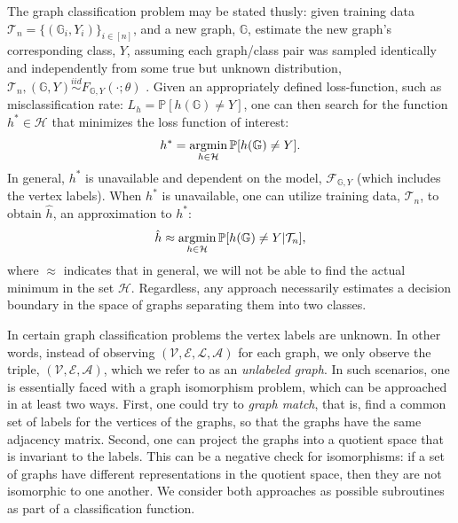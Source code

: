 \documentclass{article} %
\newcommand{\argmin}{\operatornamewithlimits{argmin}}
\newcommand{\PP}{\mathbb{P}}           %
\providecommand{\mc}[1]{\mathcal{#1}}
\providecommand{\mh}[1]{\hat{#1}}
\newcommand{\iid}{\overset{iid}{\sim}}
\newcommand{\GG}{\mathbb{G}}
\begin{document}
The graph classification problem may be stated thusly: given training data $\mc{T}_n=\{(\GG_i,Y_i)\}_{i \in [n]}$, and a new graph, $\GG$, estimate the new graph's corresponding class, $Y$, assuming each graph/class pair was sampled identically and independently from some true but unknown distribution, $\mc{T}_n,(\GG,Y) \iid F_{\GG,Y}(\cdot; \theta)$ .  Given an appropriately defined loss-function, such as misclassification rate: $L_h=\PP[h(\GG) \neq Y]$, one can then search for the function $h^* \in \mc{H}$ that minimizes the loss function of interest:
\begin{align}
	h^* = \argmin_{h \in \mc{H}} \PP[h(\GG) \neq Y].
\end{align}
In general, $h^*$ is unavailable and dependent on the model, $\mc{F}_{\GG,Y}$ (which includes the vertex labels).  When $h^*$ is unavailable, one can utilize training data, $\mc{T}_n$, to obtain $\mh{h}$, an approximation to $h^*$:
\begin{align}
	\mh{h} \approx \argmin_{h \in \mc{H}} \PP[h(\GG) \neq Y | \mc{T}_n],
\end{align}
where $\approx$ indicates that in general, we will not be able to find the actual minimum in the set $\mc{H}$. Regardless, any approach necessarily estimates a decision boundary in the space of graphs separating them into two classes.  %





In certain graph classification problems the vertex labels are unknown.  In other words, instead of observing $(\mc{V},\mc{E},\mc{L},\mc{A})$ for each graph, we only observe the triple, $(\mc{V},\mc{E},\mc{A})$, which we refer to as an \emph{unlabeled graph}.  In such scenarios, one is essentially faced with a graph isomorphism problem, which can be approached in at least two ways.  First, one could try to \emph{graph match}, that is, find a common set of labels for the vertices of the graphs, so that the graphs have the same adjacency matrix. Second, one can project the graphs into a quotient space that is invariant to the labels.  This can be a negative check for isomorphisms: if a set of graphs have different representations in the quotient space, then they are not isomorphic to one another.  We consider both approaches as possible subroutines as part of a classification function.
\end{document}
